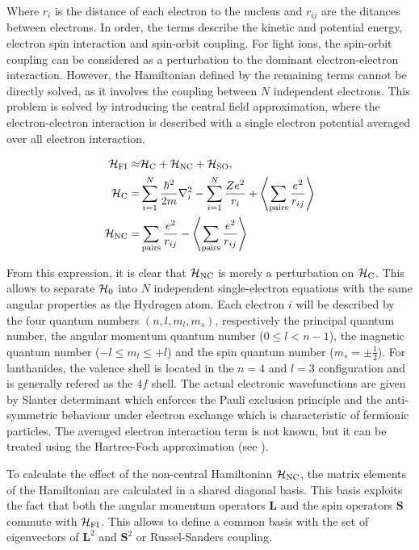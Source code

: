 Where $r_i$ is the distance of each electron to the nucleus and $r_{ij}$ are the ditances between electrons. In order, the terms describe the kinetic and potential energy, electron spin interaction and spin-orbit coupling. For light ions, the spin-orbit coupling can be considered as a perturbation to the dominant electron-electron interaction. However, the Hamiltonian defined by the remaining terms cannot be directly solved, as it involves the coupling between $N$ independent electrons. This problem is solved by introducing the central field approximation, where the electron-electron interaction is described with a single electron potential averaged over all electron interaction. 

\begin{align}
\begin{split}
    \mathcal{H}_{\text{FI}} \approx& \mathcal{H}_{\text{C}} + \mathcal{H}_{\text{NC}} + \mathcal{H}_{\text{SO}}, \\
    \mathcal{H}_{\text{C}} =& \sum_{i=1}^N \frac{\hbar^2}{2m} \nabla_i^2  - \sum_{i=1}^N \frac{Ze^2}{r_i} + \left\langle\sum_{\text{pairs}} \frac{e^2}{r_{ij}}\right\rangle\\
    \mathcal{H}_{\text{NC}} =& \sum_{\text{pairs}} \frac{e^2}{r_{ij}} - \left\langle\sum_{\text{pairs}} \frac{e^2}{r_{ij}}\right\rangle
\end{split}
\end{align}

From this expression, it is clear that $\mathcal{H}_{\text{NC}}$ is merely a perturbation on $\mathcal{H}_{\text{C}}$. This allows to separate $\mathcal{H}_{\text{0}}$ into $N$ independent single-electron equations with the same angular properties as the Hydrogen atom. Each electron $i$ will be described by the four quantum numbers $(n, l, m_l, m_s)$, respectively the principal quantum number, the angular momentum quantum number ($0\leq l<n-1$), the magnetic quantum number ($-l\leq m_l\leq +l$) and the spin quantum number ($m_s=\pm\tfrac{1}{2}$). For lanthanides, the valence shell is located in the $n=4$ and $l=3$ configuration and is generally refered as the $4f$ shell. The actual electronic wavefunctions are given by Slanter determinant which enforces the Pauli exclusion principle and the anti-symmetric behaviour under electron exchange which is characteristic of fermionic particles. The averaged electron interaction term is not known, but it can be treated using the Hartree-Foch approximation (see \cite{weissbluth_atoms_2012}).

To calculate the effect of the non-central Hamiltonian $\mathcal{H}_{\text{NC}}$, the matrix elements of the Hamiltonian are calculated in a shared diagonal basis. This basis exploits the fact that both the angular momentum operators $\mathbf{L}$ and the spin operators $\mathbf{S}$ commute with $\mathcal{H}_{\text{FI}}$. This allows to define a common basis with the set of eigenvectors of $\mathbf{L}^2$ and $\mathbf{S}^2$ or Russel-Sanders coupling.

